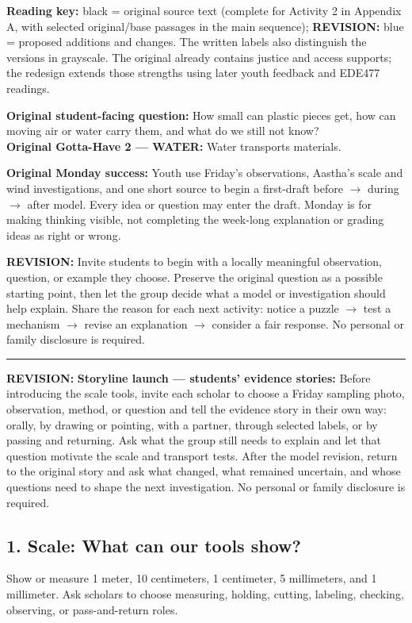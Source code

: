 \documentclass[11pt]{article}
\newcommand{\secx}[1]{\par\Needspace{5\baselineskip}\addvspace{0.10in}{\Large\bfseries\color{PrimaryRed}#1}\par\color{DeepNavy}\hrule\color{black}\vspace{0.08in}}
\newcommand{\original}[1]{{\color{black}#1}}
\newcommand{\revision}[1]{{\color{Addition}\textbf{REVISION:} #1}}
\begin{document}
\textbf{Reading key:} \original{black = original source text (complete for Activity 2 in Appendix A, with selected original/base passages in the main sequence)}; \revision{blue = proposed additions and changes.} The written labels also distinguish the versions in grayscale. The original already contains justice and access supports; the redesign extends those strengths using later youth feedback and EDE477 readings.

\begin{focusbox}\original{\textbf{Original student-facing question:} How small can plastic pieces get, how can moving air or water carry them, and what do we still not know?}\\[4pt]
\original{\textbf{Original Gotta-Have 2 --- WATER:} Water transports materials.}\end{focusbox}

\original{\textbf{Original Monday success:} Youth use Friday's observations, Aastha's scale and wind investigations, and one short source to begin a first-draft before $\rightarrow$ during $\rightarrow$ after model. Every idea or question may enter the draft. Monday is for making thinking visible, not completing the week-long explanation or grading ideas as right or wrong.}

\revision{Invite students to begin with a locally meaningful observation, question, or example they choose. Preserve the original question as a possible starting point, then let the group decide what a model or investigation should help explain. Share the reason for each next activity: notice a puzzle $\rightarrow$ test a mechanism $\rightarrow$ revise an explanation $\rightarrow$ consider a fair response. No personal or family disclosure is required.}

\secx{Revised Investigation}
\revision{\textbf{Storyline launch --- students' evidence stories:} Before introducing the scale tools, invite each scholar to choose a Friday sampling photo, observation, method, or question and tell the evidence story in their own way: orally, by drawing or pointing, with a partner, through selected labels, or by passing and returning. Ask what the group still needs to explain and let that question motivate the scale and transport tests. After the model revision, return to the original story and ask what changed, what remained uncertain, and whose questions need to shape the next investigation. No personal or family disclosure is required.}
\subsection*{1. Scale: What can our tools show?}
\original{Show or measure 1 meter, 10 centimeters, 1 centimeter, 5 millimeters, and 1 millimeter. Ask scholars to choose measuring, holding, cutting, labeling, checking, observing, or pass-and-return roles.}
\end{document}
